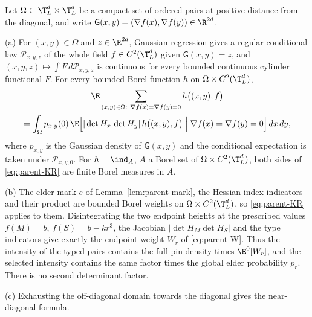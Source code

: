 \begin{proposition}\label{prop:parent-KR}
Let $\Omega\subset\T^d_L\times\T^d_L$ be a compact set of ordered pairs at positive distance from the diagonal, and write $\mathsf G(x,y)=(\nabla f(x),\nabla f(y))\in\R^{2d}$.

\textup{(a)} For $(x,y)\in\Omega$ and $z\in\R^{2d}$, Gaussian regression gives a regular conditional law $\mathcal P_{x,y,z}$ of the whole field $f\in C^2(\T^d_L)$ given $\mathsf G(x,y)=z$, and $(x,y,z)\mapsto\int F\,d\mathcal P_{x,y,z}$ is continuous for every bounded continuous cylinder functional $F$. For every bounded Borel function $h$ on $\Omega\times C^2(\T^d_L)$,
\begin{multline}\label{eq:parent-KR}
\E\sum_{(x,y)\in\Omega:\ \nabla f(x)=\nabla f(y)=0}h\bigl((x,y),f\bigr)\\
=\int_\Omega p_{x,y}(0)\,\E\Bigl[|\det H_x\,\det H_y|\,h\bigl((x,y),f\bigr)\Bigm|\nabla f(x)=\nabla f(y)=0\Bigr]\,dx\,dy,
\end{multline}
where $p_{x,y}$ is the Gaussian density of $\mathsf G(x,y)$ and the conditional expectation is taken under $\mathcal P_{x,y,0}$. For $h=\ind_A$, $A$ a Borel set of $\Omega\times C^2(\T^d_L)$, both sides of \eqref{eq:parent-KR} are finite Borel measures in $A$.

\textup{(b)} The elder mark $e$ of Lemma~\ref{lem:parent-mark}, the Hessian index indicators and their product are bounded Borel weights on $\Omega\times C^2(\T^d_L)$, so \eqref{eq:parent-KR} applies to them. Disintegrating the two endpoint heights at the prescribed values $f(M)=b$, $f(S)=b-kr^3$, the Jacobian $|\det H_M\det H_S|$ and the type indicators give exactly the endpoint weight $W_r$ of \eqref{eq:parent-W}. Thus the intensity of the typed pairs contains the full-pin density times $\E^0[W_r]$, and the selected intensity contains the same factor times the global elder probability $p_r$. There is no second determinant factor.

\textup{(c)} Exhausting the off-diagonal domain towards the diagonal gives the near-diagonal formula.
\end{proposition}

